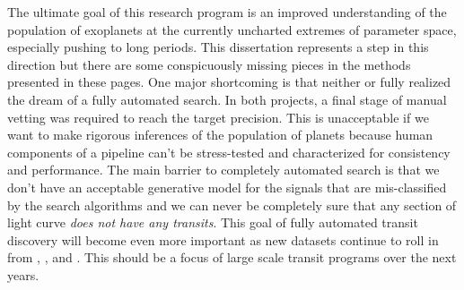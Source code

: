 The ultimate goal of this research program is an improved understanding of the
population of exoplanets at the currently uncharted extremes of parameter
space, especially pushing to long periods.
This dissertation represents a step in this direction but there are some
conspicuously missing pieces in the methods presented in these pages.
One major shortcoming is that neither  or  fully
realized the dream of a fully automated search.
In both projects, a final stage of manual vetting was required to reach the
target precision.
This is unacceptable if we want to make rigorous inferences of the population
of planets because human components of a pipeline can't be stress-tested and
characterized for consistency and performance.
The main barrier to completely automated search is that we don't have an
acceptable generative model for the signals that are mis-classified by the
search algorithms and we can never be completely sure that any section of
light curve \emph{does not have any transits}.
This goal of fully automated transit discovery will become even more important
as new datasets continue to roll in from \KT, \tess, and \plato.
This should be a focus of large scale transit programs over the next years.










